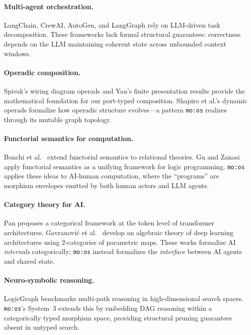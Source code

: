 \documentclass[submission,copyright,creativecommons]{eptcs}
\begin{document}
\paragraph{Multi-agent orchestration.}
LangChain, CrewAI, AutoGen, and LangGraph rely on LLM-driven task
decomposition. These frameworks lack formal structural guarantees: correctness
depends on the LLM maintaining coherent state across unbounded context windows.

\paragraph{Operadic composition.}
Spivak's wiring diagram operads \cite{spivak2013,spivak2013operad} and Yau's
finite presentation results \cite{yau2018} provide the mathematical foundation
for our port-typed composition. Shapiro et al.'s dynamic operads
\cite{shapiro2022} formalize how operadic structure evolves---a pattern
\texttt{mo:os} realizes through its mutable graph topology.

\paragraph{Functorial semantics for computation.}
Bonchi et al.\ \cite{bonchi2017functorial} extend functorial semantics to
relational theories. Gu and Zanasi \cite{gu2021functorial} apply functorial
semantics as a unifying framework for logic programming. \texttt{mo:os}
applies these ideas to AI-human computation, where the ``programs'' are
morphism envelopes emitted by both human actors and LLM agents.

\paragraph{Category theory for AI.}
Pan \cite{pan2024token} proposes a categorical framework at the token level of
transformer architectures. Gavranovi{\'c} et al.\ \cite{gavranovic2024categorical}
develop an algebraic theory of deep learning architectures using 2-categories
of parametric maps. These works formalize AI \emph{internals} categorically;
\texttt{mo:os} instead formalizes the \emph{interface} between AI agents and
shared state.

\paragraph{Neuro-symbolic reasoning.}
LogicGraph \cite{logicgraph2025} benchmarks multi-path reasoning in
high-dimensional search spaces. \texttt{mo:os}'s System~3 extends this by
embedding DAG reasoning within a categorically typed morphism space, providing
structural pruning guarantees absent in untyped search.
\end{document}
